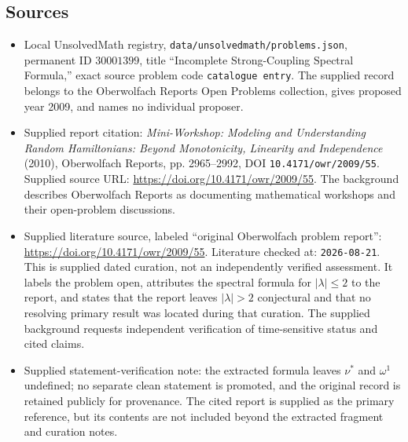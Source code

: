 \documentclass[11pt]{article}
\begin{document}
\subsection{Sources}
\begin{itemize}
\item Local UnsolvedMath registry, \texttt{data/unsolvedmath/problems.json}, permanent ID \(30001399\), title ``Incomplete Strong-Coupling Spectral Formula,'' exact source problem code \texttt{catalogue entry}. The supplied record belongs to the Oberwolfach Reports Open Problems collection, gives proposed year 2009, and names no individual proposer.
\item Supplied report citation: \emph{Mini-Workshop: Modeling and Understanding Random Hamiltonians: Beyond Monotonicity, Linearity and Independence} (2010), Oberwolfach Reports, pp. 2965--2992, DOI \texttt{10.4171/owr/2009/55}. Supplied source URL: \url{https://doi.org/10.4171/owr/2009/55}. The background describes Oberwolfach Reports as documenting mathematical workshops and their open-problem discussions.
\item Supplied literature source, labeled ``original Oberwolfach problem report'': \url{https://doi.org/10.4171/owr/2009/55}. Literature checked at: \texttt{2026-08-21}. This is supplied dated curation, not an independently verified assessment. It labels the problem open, attributes the spectral formula for \(|\lambda|\leq2\) to the report, and states that the report leaves \(|\lambda|>2\) conjectural and that no resolving primary result was located during that curation. The supplied background requests independent verification of time-sensitive status and cited claims.
\item Supplied statement-verification note: the extracted formula leaves \(\nu^*\) and \(\omega^1\) undefined; no separate clean statement is promoted, and the original record is retained publicly for provenance. The cited report is supplied as the primary reference, but its contents are not included beyond the extracted fragment and curation notes.
\end{itemize}
\end{document}
